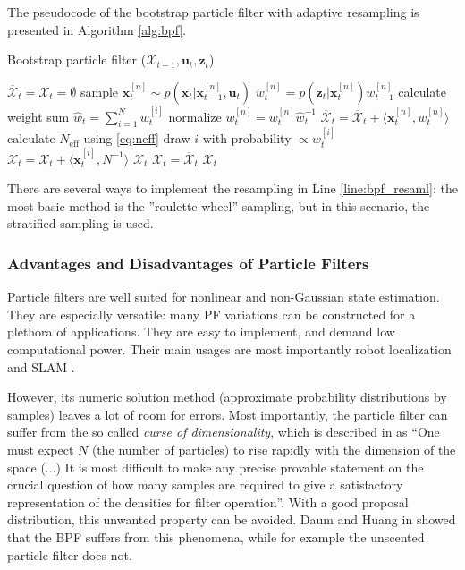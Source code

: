The pseudocode of the bootstrap particle filter with adaptive resampling is presented in Algorithm \ref{alg:bpf}.
\begin{algorithm}[b!]
    \caption{Bootstrap particle filter ($\mathcal{X}_{t-1}, \mathbf{u}_t, \mathbf{z}_t$)}\label{alg:bpf}
    \begin{algorithmic}[1]
        \State $\overline{\mathcal{X}}_t = \mathcal{X}_t = \emptyset$
        \State sample $\mathbf{x}_t^{[n]} \sim p(\mathbf{x}_t|\mathbf{x}_{t-1}^{[n]},\mathbf{u}_t)$
        \State$w_t^{[n]} = p(\mathbf{z}_t|\mathbf{x}_{t}^{[n]})w_{t-1}^{[n]}$
        \EndFor
        \State calculate weight sum $\hat{w}_{t} = \sum_{i = 1}^{N}w_t^{[i]}$
        \State normalize $w_t^{[n]} = w_t^{[n]}\hat{w}_t^{-1}$
        \State$\overline{\mathcal{X}}_t = \overline{\mathcal{X}}_t + \langle \mathbf{x}_t^{[n]},w_t^{[n]}\rangle$
        \EndFor
        \State calculate $N_{\mathrm{eff}}$ using \eqref{eq:neff}
        \State draw $i$ with probability $\propto w_t^{[i]}$ \label{line:bpf_resaml}
        \State${\mathcal{X}}_t ={\mathcal{X}}_t + \langle \mathbf{x}_t^{[i]},N^{-1}\rangle$
        \EndFor
        \State\Return $\mathcal{X}_t$
        \Else
        \State$\mathcal{X}_t = \overline{\mathcal{X}}_t$
        \State\Return $\mathcal{X}_t$
        \EndIf
    \end{algorithmic}
\end{algorithm}
There are several ways to implement the resampling in Line \ref{line:bpf_resaml}: the most basic method is the ''roulette wheel'' sampling, but in this scenario, the stratified sampling \cite{stratified} is used.
\subsubsection{Advantages and Disadvantages of Particle Filters}\label{sec:pf_adv_disadv}
Particle filters are well suited for nonlinear and non-Gaussian state estimation. They are especially versatile: many PF variations can be constructed for a plethora of applications. They are easy to implement, and demand low computational power. Their main usages are most importantly robot localization \cite{amcl} and  SLAM \cite{gmapping1}.

However, its numeric solution method (approximate probability distributions by samples) leaves a lot of room for errors. Most importantly, the particle filter can suffer from the so called \emph{curse of dimensionality}, which is described in \cite{bpf} as ``One must expect $N$ (the number of particles) to rise rapidly with the dimension of the space (...) It is most difficult to make any precise provable statement on the crucial question of how many samples are required to give a satisfactory representation of the densities for filter operation''. With a good proposal distribution, this unwanted property can be avoided. Daum and Huang in \cite{curse_of_dim} showed that the BPF suffers from this phenomena, while for example the unscented particle filter does not.

